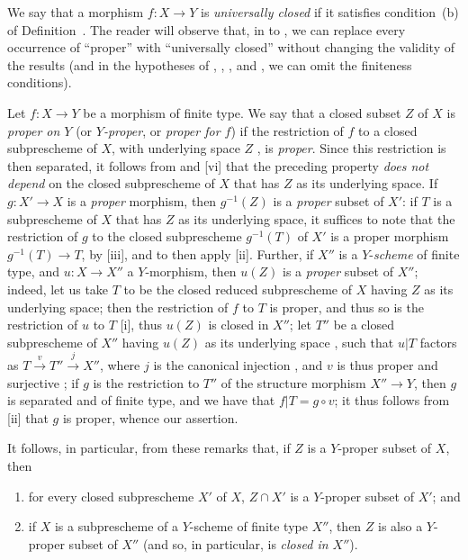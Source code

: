 \begin{remark}[5.4.9]
\label{II.5.4.9}
We say that a morphism $f:X\to Y$ is \emph{universally closed} if it satisfies condition~(b) of Definition~.
The reader will observe that,
in  to , we can replace every occurrence of ``proper'' with ``universally closed'' without changing the validity of the results (and in the hypotheses of , , , and , we can omit the finiteness conditions).
\end{remark}

\begin{env}[5.4.10]
\label{II.5.4.10}
Let $f:X\to Y$ be a morphism of finite type.
We say that a closed subset $Z$ of $X$ is \emph{proper on $Y$} (or \emph{$Y$-proper}, or \emph{proper for $f$}) if the restriction of $f$ to a closed subprescheme of $X$, with underlying space $Z$ , is \emph{proper}.
Since this restriction is then separated, it follows from  and [vi] that the preceding property \emph{does not depend} on the closed subprescheme of $X$ that has $Z$ as its underlying space.
If $g:X'\to X$ is a \emph{proper} morphism, then $g^{-1}(Z)$ is a \emph{proper} subset of $X'$:
if $T$ is a subprescheme of $X$ that has $Z$ as its underlying space, it suffices to note that the restriction of $g$ to the closed subprescheme $g^{-1}(T)$ of $X'$ is a proper morphism $g^{-1}(T)\to T$, by [iii], and to then apply [ii].
Further, if $X''$ is a $Y$-\emph{scheme} of finite type, and $u:X\to X''$ a $Y$-morphism, then $u(Z)$ is a \emph{proper} subset of $X''$;
indeed, let us take $T$ to be the closed reduced subprescheme of $X$ having $Z$ as its underlying space;
then the restriction of $f$ to $T$ is proper, and thus so is the restriction of $u$ to $T$ [i], thus $u(Z)$ is closed in $X''$;
let $T''$ be a closed subprescheme of $X''$ having $u(Z)$ as its underlying space , such that $u|T$ factors as $T\xrightarrow{v}T''\xrightarrow{j}X''$, where $j$ is the canonical injection , and $v$ is thus proper and surjective ;
if $g$ is the restriction to $T''$ of the structure morphism $X''\to Y$, then $g$ is separated and of finite type, and we have that $f|T=g\circ v$;
it thus follows from [ii] that $g$ is proper, whence our assertion.
\end{env}

It follows, in particular, from these remarks that, if $Z$ is a $Y$-proper subset of $X$, then
\begin{enumerate}
  \item for every closed subprescheme $X'$ of $X$, $Z\cap X'$ is a $Y$-proper subset of $X'$; and
  \item if $X$ is a subprescheme of a $Y$-scheme of finite type $X''$, then $Z$ is also a $Y$-proper subset of $X''$ (and so, in particular, is \emph{closed in $X''$}).
\end{enumerate}

